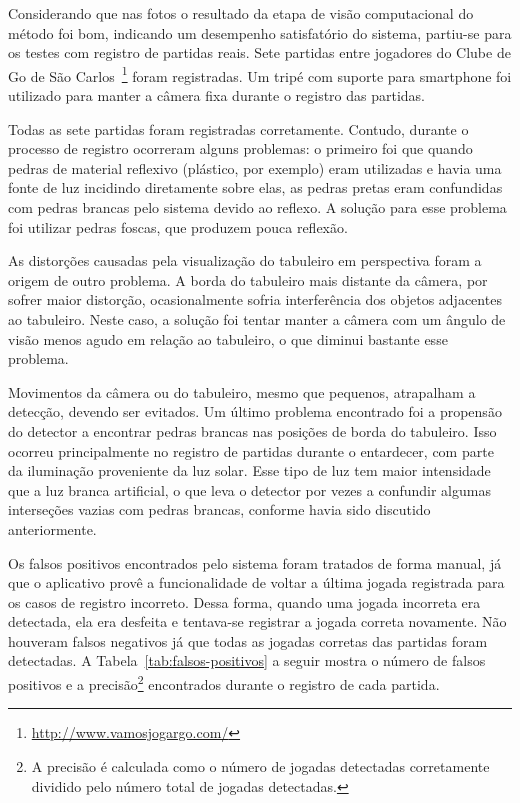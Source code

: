 Considerando que nas fotos o resultado da etapa de visão computacional do método foi bom, indicando um desempenho satisfatório do sistema, partiu-se para os testes com registro de partidas reais. Sete partidas entre jogadores do Clube de Go de São Carlos~\footnote{\url{http://www.vamosjogargo.com/}} foram registradas. Um tripé com suporte para smartphone foi utilizado para manter a câmera fixa durante o registro das partidas.

Todas as sete partidas foram registradas corretamente. Contudo, durante o processo de registro ocorreram alguns problemas: o primeiro foi que quando pedras de material reflexivo (plástico, por exemplo) eram utilizadas e havia uma fonte de luz incidindo diretamente sobre elas, as pedras pretas eram confundidas com pedras brancas pelo sistema devido ao reflexo. A solução para esse problema foi utilizar pedras foscas, que produzem pouca reflexão.

As distorções causadas pela visualização do tabuleiro em perspectiva foram a origem de outro problema. A borda do tabuleiro mais distante da câmera, por sofrer maior distorção, ocasionalmente sofria interferência dos objetos adjacentes ao tabuleiro. Neste caso, a solução foi tentar manter a câmera com um ângulo de visão menos agudo em relação ao tabuleiro, o que diminui bastante esse problema. 

Movimentos da câmera ou do tabuleiro, mesmo que pequenos, atrapalham a detecção, devendo ser evitados. Um último problema encontrado foi a propensão do detector a encontrar pedras brancas nas posições de borda do tabuleiro. Isso ocorreu principalmente no registro de partidas durante o entardecer, com parte da iluminação proveniente da luz solar. Esse tipo de luz tem maior intensidade que a luz branca artificial, o que leva o detector por vezes a confundir algumas interseções vazias com pedras brancas, conforme havia sido discutido anteriormente.

Os falsos positivos encontrados pelo sistema foram tratados de forma manual, já que o aplicativo provê a funcionalidade de voltar a última jogada registrada para os casos de registro incorreto. Dessa forma, quando uma jogada incorreta era detectada, ela era desfeita e tentava-se registrar a jogada correta novamente. Não houveram falsos negativos já que todas as jogadas corretas das partidas foram detectadas. A Tabela~\ref{tab:falsos-positivos} a seguir mostra o número de falsos positivos e a precisão\footnote{A precisão é calculada como o número de jogadas detectadas corretamente dividido pelo número total de jogadas detectadas.} encontrados durante o registro de cada partida.

